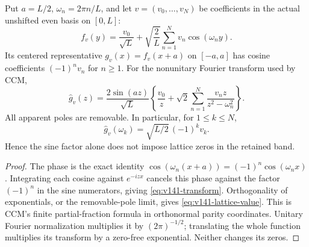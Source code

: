 \begin{lemma}
\label{lem:v141-centering}
Put $a=L/2$, $\omega_n=2\pi n/L$, and let $v=(v_0,\ldots,v_N)$
be coefficients in the actual unshifted even basis on $[0,L]$:
\[
 f_v(y)=\frac{v_0}{\sqrt L}
       +\sqrt{\frac2L}\sum_{n=1}^Nv_n\cos(\omega_n y).
\]
Its centered representative $g_v(x)=f_v(x+a)$ on $[-a,a]$ has
cosine coefficients $(-1)^nv_n$ for $n\ge1$. For the nonunitary
Fourier transform used by CCM,
\begin{equation}\label{eq:v141-transform}
 \widehat g_v(z)=\frac{2\sin(az)}{\sqrt L}
 \left\{\frac{v_0}{z}+\sqrt2\sum_{n=1}^N
          \frac{v_nz}{z^2-\omega_n^2}\right\}.
\end{equation}
All apparent poles are removable. In particular, for $1\le k\le N$,
\begin{equation}\label{eq:v141-lattice-value}
 \widehat g_v(\omega_k)=\sqrt{L/2}\,(-1)^kv_k.
\end{equation}
Hence the sine factor alone does not impose lattice zeros in the
retained band.
\end{lemma}
\begin{proof}
The phase is the exact identity
$\cos(\omega_n(x+a))=(-1)^n\cos(\omega_nx)$.
Integrating each cosine against $e^{-izx}$ cancels this phase
against the factor $(-1)^n$ in the sine numerators, giving
\eqref{eq:v141-transform}. Orthogonality of exponentials, or the
removable-pole limit, gives \eqref{eq:v141-lattice-value}.
This is CCM's finite partial-fraction formula in orthonormal parity
coordinates. Unitary Fourier normalization multiplies it by
$(2\pi)^{-1/2}$; translating the whole function multiplies its
transform by a zero-free exponential. Neither changes its zeros.
\end{proof}

